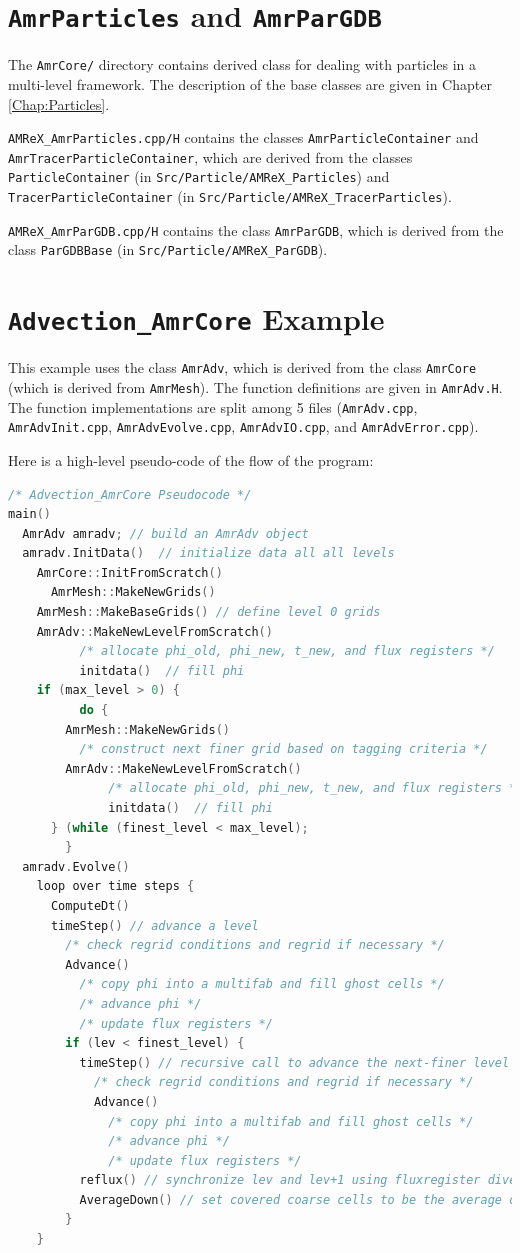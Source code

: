 \section{{\tt AmrParticles} and {\tt AmrParGDB}}

The {\tt AmrCore/} directory contains derived class for dealing with particles 
in a multi-level framework.  The description of the base classes
are given in Chapter \ref{Chap:Particles}.

{\tt AMReX\_AmrParticles.cpp/H} contains the classes {\tt AmrParticleContainer}
and {\tt AmrTracerParticleContainer}, which are derived from the classes
{\tt ParticleContainer} (in {\tt Src/Particle/AMReX\_Particles})
and {\tt TracerParticleContainer} (in {\tt Src/Particle/AMReX\_TracerParticles}).

{\tt AMReX\_AmrParGDB.cpp/H} contains the class {\tt AmrParGDB}, which is derived from
the class {\tt ParGDBBase} (in {\tt Src/Particle/AMReX\_ParGDB}).

\section{{\tt Advection\_AmrCore} Example}
This example uses the class {\tt AmrAdv}, which is derived from the class {\tt AmrCore} 
(which is derived from {\tt AmrMesh}).  The function definitions are given in {\tt AmrAdv.H}.
The function implementations are split among 5 files 
({\tt AmrAdv.cpp}, {\tt AmrAdvInit.cpp}, {\tt AmrAdvEvolve.cpp}, {\tt AmrAdvIO.cpp}, and {\tt AmrAdvError.cpp}).

Here is a high-level pseudo-code of the flow of the program:
\begin{lstlisting}[language=cpp]
/* Advection_AmrCore Pseudocode */
main()
  AmrAdv amradv; // build an AmrAdv object
  amradv.InitData()  // initialize data all all levels
    AmrCore::InitFromScratch()
      AmrMesh::MakeNewGrids()
	AmrMesh::MakeBaseGrids() // define level 0 grids
	AmrAdv::MakeNewLevelFromScratch()
          /* allocate phi_old, phi_new, t_new, and flux registers */
          initdata()  // fill phi
	if (max_level > 0) {
          do {
  	    AmrMesh::MakeNewGrids()
	      /* construct next finer grid based on tagging criteria */
 	    AmrAdv::MakeNewLevelFromScratch()
              /* allocate phi_old, phi_new, t_new, and flux registers */
              initdata()  // fill phi
	  } (while (finest_level < max_level);
        }
  amradv.Evolve()
    loop over time steps {
      ComputeDt()
      timeStep() // advance a level
        /* check regrid conditions and regrid if necessary */
        Advance()
          /* copy phi into a multifab and fill ghost cells */
          /* advance phi */
          /* update flux registers */
        if (lev < finest_level) {
          timeStep() // recursive call to advance the next-finer level "r" times
            /* check regrid conditions and regrid if necessary */
            Advance()
              /* copy phi into a multifab and fill ghost cells */
              /* advance phi */
              /* update flux registers */
          reflux() // synchronize lev and lev+1 using fluxregister divergence
          AverageDown() // set covered coarse cells to be the average of fine
        }
    }
\end{lstlisting}
